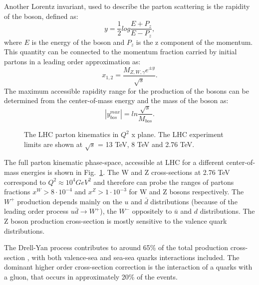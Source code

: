 Another Lorentz invariant, used to describe the parton scattering is the rapidity of the boson, defined as:
\begin{equation}
y = \frac{1}{2} log \frac{E+P_z}{E-P_z},
\end{equation}
where $E$ is the energy of the boson and $P_z$ is the z component of the momentum.
This quantity can be connected to the momentum fraction carried by initial partons in a leading order approximation as:
\begin{equation}
x_{1,2}=\frac{M_{Z,W,\gamma}e^{\pm y}}{\sqrt{s}}.
\end{equation}
The maximum accessible rapidity range for the production of the bosons can be determined from the center-of-mass energy and the mass of the boson as:
\begin{equation}
|y^{max}_{bos}| = ln \frac{\sqrt{s}}{M_{bos}}.
\end{equation}

\begin{figure}[!tb]
\caption{The LHC parton kinematics in $Q^2$ x plane. The LHC experiment limits are shown at $\sqrt{s}$ = 13 TeV, 8 TeV and 2.76 TeV.}
\label{fig:PartKin}
\end{figure}

The full parton kinematic phase-space, accessible at LHC for a different center-of-mass energies is shown in Fig.~\ref{fig:PartKin}. The W and Z cross-sections at 2.76 TeV correspond to $Q^2\approx 10^4 GeV^2$ and therefore can probe the ranges of partons fractions $x^{W}>8\cdot 10^{-4}$ and $x^{Z}>1 \cdot 10^{-3}$  for W and Z bosons respectively.  The $W^{+}$ production depends mainly on the $u$ and $\bar{d}$ distributions (because of the leading order process $u\bar{d}\to W^+$), the $W^{-}$ oppositely to $\bar{u}$ and $d$ distributions. The Z boson production cross-section is mostly sensitive to the valence quark distributions.

The Drell-Yan process contributes to around 65\% of the total production cross-section \cite{Ellis:318585}, with both valence-sea and sea-sea quarks interactions included. The dominant higher order cross-section  correction is the interaction of a quarks with a gluon, that occurs in approximately 20\% of the events. 

